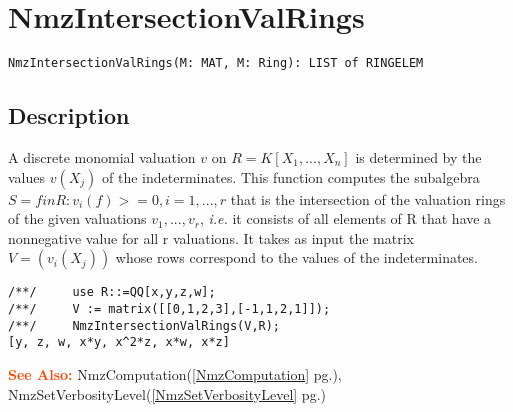\documentclass[a4paper]{mybook}
\newenvironment{command}{}{} %
\newcommand\SeeAlso{\par\textcolor{OrangeRed}{\textbf{\large See Also: }}}
\begin{document}
\section{NmzIntersectionValRings}
\label{NmzIntersectionValRings}
\begin{command} %


\begin{Verbatim}[label=syntax, rulecolor=\color{MidnightBlue},
frame=single]
NmzIntersectionValRings(M: MAT, M: Ring): LIST of RINGELEM
\end{Verbatim}


\subsection*{Description}

A discrete monomial valuation $v$ on $R=K[X_1,...,X_n]$
is determined by the values $v(X_j)$ of the indeterminates.
This function computes the subalgebra
$S = {f in R: v_i(f) >= 0, i=1,...,r}$
that is the intersection of the valuation rings of the given
valuations $v_1, ...,v_r$, \textit{i.e.} it consists of all
elements of R that have a nonnegative value for all r valuations.
It takes as input the matrix $V=(v_i(X_j))$ whose
rows correspond to the values of the indeterminates.
\begin{Verbatim}[label=example, rulecolor=\color{PineGreen}, frame=single]
/**/     use R::=QQ[x,y,z,w];
/**/     V := matrix([[0,1,2,3],[-1,1,2,1]]);
/**/     NmzIntersectionValRings(V,R);
[y, z, w, x*y, x^2*z, x*w, x*z]
\end{Verbatim}


\SeeAlso %
  NmzComputation(\ref{NmzComputation} pg.\pageref{NmzComputation}), 
    NmzSetVerbosityLevel(\ref{NmzSetVerbosityLevel} pg.\pageref{NmzSetVerbosityLevel})
\end{command} %
\end{document}
